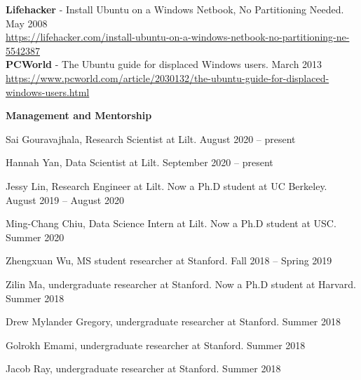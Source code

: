 \documentclass[10pt,A4]{article}
\newcommand{\cvsection}[1]
{
	\begin{center}
		\large\textcolor{sectcol}{\textbf{#1}}
	\end{center}
}
\newcommand{\mystrut}{\rule[-.3\baselineskip]{0pt}{\baselineskip}}
\begin{document}
\textbf{Lifehacker} - Install Ubuntu on a Windows Netbook, No Partitioning Needed. \hfill May 2008\\
\url{https://lifehacker.com/install-ubuntu-on-a-windows-netbook-no-partitioning-ne-5542387}\\

\textbf{PCWorld} - The Ubuntu guide for displaced Windows users. \hfill March 2013\\
\url{https://www.pcworld.com/article/2030132/the-ubuntu-guide-for-displaced-windows-users.html}\\

\cvsection{Management and Mentorship}

Sai Gouravajhala, Research Scientist at Lilt. \hfill August 2020 -- present

Hannah Yan, Data Scientist at Lilt. \hfill September 2020 -- present

Jessy Lin, Research Engineer at Lilt. Now a Ph.D student at UC Berkeley. \hfill August 2019 -- August 2020

Ming-Chang Chiu, Data Science Intern at Lilt. Now a Ph.D student at USC. \hfill Summer 2020

Zhengxuan Wu, MS student researcher at Stanford. \hfill Fall 2018 -- Spring 2019

Zilin Ma, undergraduate researcher at Stanford. Now a Ph.D student at Harvard. \hfill Summer 2018

Drew Mylander Gregory, undergraduate researcher at Stanford. \hfill Summer 2018

Golrokh Emami, undergraduate researcher at Stanford. \hfill Summer 2018

Jacob Ray, undergraduate researcher at Stanford. \hfill Summer 2018\\





%
%
%
%
%
%
\end{document}
